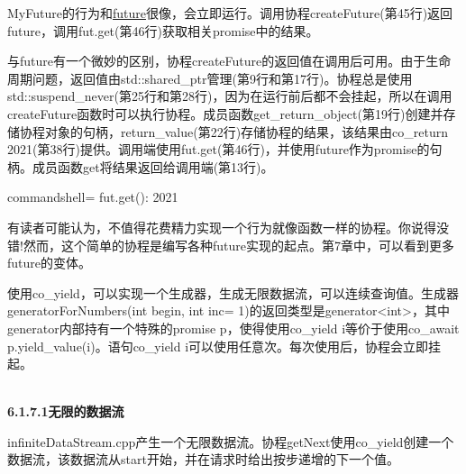 MyFuture的行为和\href{https://en.cppreference.com/w/cpp/thread/future}{future}很像，会立即运行。调用协程createFuture(第45行)返回future，调用fut.get(第46行)获取相关promise中的结果。

与future有一个微妙的区别，协程createFuture的返回值在调用后可用。由于生命周期问题，返回值由std::shared\_ptr管理(第9行和第17行)。协程总是使用std::suspend\_never(第25行和第28行)，因为在运行前后都不会挂起，所以在调用createFuture函数时可以执行协程。成员函数get\_return\_object(第19行)创建并存储协程对象的句柄，return\_value(第22行)存储协程的结果，该结果由co\_return 2021(第38行)提供。调用端使用fut.get(第46行)，并使用future作为promise的句柄。成员函数get将结果返回给调用端(第13行)。

\begin{tcblisting}{commandshell={}}
fut.get(): 2021
\end{tcblisting}

有读者可能认为，不值得花费精力实现一个行为就像函数一样的协程。你说得没错!然而，这个简单的协程是编写各种future实现的起点。第7章中，可以看到更多future的变体。


使用co\_yield，可以实现一个生成器，生成无限数据流，可以连续查询值。生成器generatorForNumbers(int begin, int inc= 1)的返回类型是generator<int>，其中generator内部持有一个特殊的promise p，使得使用co\_yield i等价于使用co\_await p.yield\_value(i)。语句co\_yield i可以使用任意次。每次使用后，协程会立即挂起。

\hspace*{\fill} \\ %
\noindent
\textbf{6.1.7.1\hspace{0.2cm}无限的数据流}

infiniteDataStream.cpp产生一个无限数据流。协程getNext使用co\_yield创建一个数据流，该数据流从start开始，并在请求时给出按步递增的下一个值。

